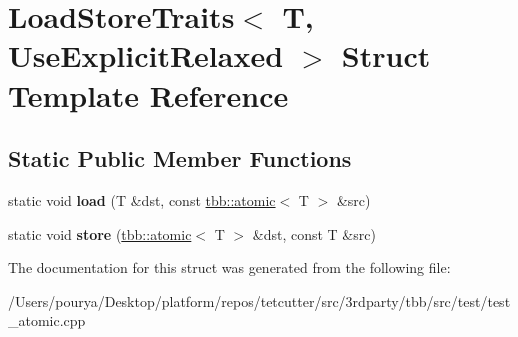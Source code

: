 \hypertarget{structLoadStoreTraits_3_01T_00_01UseExplicitRelaxed_01_4}{}\section{Load\+Store\+Traits$<$ T, Use\+Explicit\+Relaxed $>$ Struct Template Reference}
\label{structLoadStoreTraits_3_01T_00_01UseExplicitRelaxed_01_4}
\subsection*{Static Public Member Functions}
\begin{DoxyCompactItemize}
\item 
\hypertarget{structLoadStoreTraits_3_01T_00_01UseExplicitRelaxed_01_4_a7f20b86eea59bd71b91a12b2fd0954b3}{}static void {\bfseries load} (T \&dst, const \hyperlink{structtbb_1_1atomic}{tbb\+::atomic}$<$ T $>$ \&src)\label{structLoadStoreTraits_3_01T_00_01UseExplicitRelaxed_01_4_a7f20b86eea59bd71b91a12b2fd0954b3}

\item 
\hypertarget{structLoadStoreTraits_3_01T_00_01UseExplicitRelaxed_01_4_a1c391a2e66f0b0d276fa697196da8e05}{}static void {\bfseries store} (\hyperlink{structtbb_1_1atomic}{tbb\+::atomic}$<$ T $>$ \&dst, const T \&src)\label{structLoadStoreTraits_3_01T_00_01UseExplicitRelaxed_01_4_a1c391a2e66f0b0d276fa697196da8e05}

\end{DoxyCompactItemize}


The documentation for this struct was generated from the following file\+:\begin{DoxyCompactItemize}
\item 
/\+Users/pourya/\+Desktop/platform/repos/tetcutter/src/3rdparty/tbb/src/test/test\+\_\+atomic.\+cpp\end{DoxyCompactItemize}
